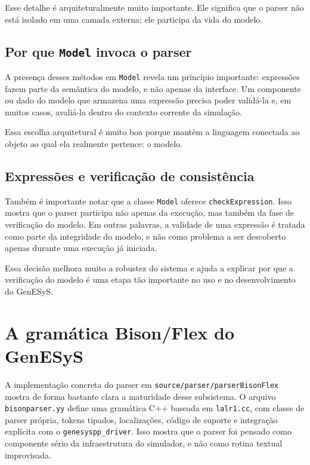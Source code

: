 Esse detalhe é arquiteturalmente muito importante. Ele significa que o parser não está isolado em uma camada externa; ele participa da vida do modelo.

\subsection{Por que \texttt{Model} invoca o parser}
\label{subsec:cap9_por_que_model_invoca_parser}

A presença desses métodos em \texttt{Model} revela um princípio importante: expressões fazem parte da semântica do modelo, e não apenas da interface. Um componente ou dado do modelo que armazena uma expressão precisa poder validá-la e, em muitos casos, avaliá-la dentro do contexto corrente da simulação.

Essa escolha arquitetural é muito boa porque mantém a linguagem conectada ao objeto ao qual ela realmente pertence: o modelo.

\subsection{Expressões e verificação de consistência}
\label{subsec:cap9_expressoes_verificacao_consistencia}

Também é importante notar que a classe \texttt{Model} oferece \texttt{checkExpression}. Isso mostra que o parser participa não apenas da execução, mas também da fase de verificação do modelo. Em outras palavras, a validade de uma expressão é tratada como parte da integridade do modelo, e não como problema a ser descoberto apenas durante uma execução já iniciada.

Essa decisão melhora muito a robustez do sistema e ajuda a explicar por que a verificação do modelo é uma etapa tão importante no uso e no desenvolvimento do GenESyS.

\section{A gramática Bison/Flex do GenESyS}
\label{sec:cap9_gramatica_bison_flex}

A implementação concreta do parser em \texttt{source/parser/parserBisonFlex} mostra de forma bastante clara a maturidade desse subsistema. O arquivo \texttt{bisonparser.yy} define uma gramática C++ baseada em \texttt{lalr1.cc}, com classe de parser própria, tokens tipados, localizações, código de suporte e integração explícita com o \texttt{genesyspp\_driver}. Isso mostra que o parser foi pensado como componente sério da infraestrutura do simulador, e não como rotina textual improvisada.

